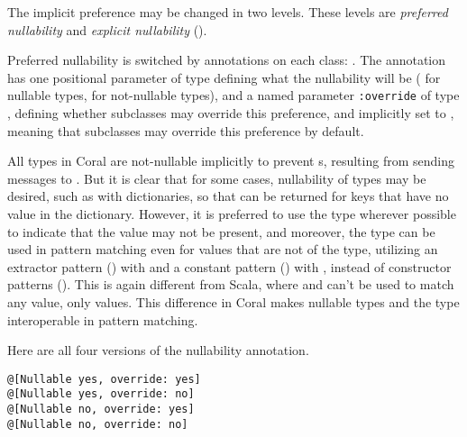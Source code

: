The implicit preference may be changed in two levels. These levels are {\em preferred nullability} and {\em explicit nullability} (). 

Preferred nullability is switched by annotations on each class: . The annotation has one positional parameter of type  defining what the nullability will be ( for nullable types,  for not-nullable types), and a named parameter \lstinline[deletekeywords={override}]!:override! of type , defining whether subclasses may override this preference, and implicitly set to , meaning that subclasses may override this preference by default. 

All types in Coral are not-nullable implicitly to prevent s, resulting from sending messages to . But it is clear that for some cases, nullability of types may be desired, such as with dictionaries, so that  can be returned for keys that have no value in the dictionary. However, it is preferred to use the  type wherever possible to indicate that the value may not be present, and moreover, the  type can be used in pattern matching even for values that are not of the  type, utilizing an extractor pattern () with  and a constant pattern () with , instead of constructor patterns (). This is again different from Scala, where  and  can't be used to match any value, only  values. This difference in Coral makes nullable types and the  type interoperable in pattern matching. 

\example Here are all four versions of the nullability annotation. 
\begin{lstlisting}[deletekeywords={override}]
@[Nullable yes, override: yes]
@[Nullable yes, override: no]
@[Nullable no, override: yes]
@[Nullable no, override: no]
\end{lstlisting}




